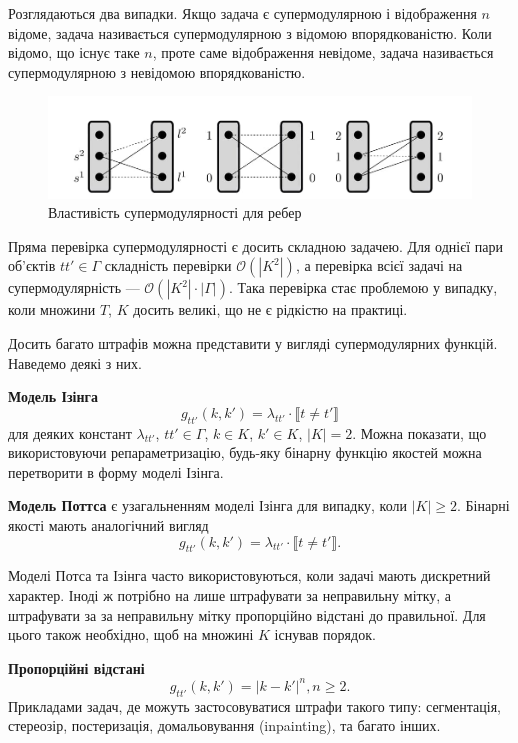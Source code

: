 Розглядаються два випадки. Якщо задача є супермодулярною і відображення $n$ відоме,
задача називається супермодулярною з відомою впорядкованістю. Коли відомо, що існує таке
$n$, проте саме відображення невідоме, задача називається супермодулярною з
невідомою впорядкованістю.
\begin{figure}[h]
  \centering
  \includegraphics[width=1\textwidth]{images/submodularity_ilustr.jpg}
  \caption{Властивість супермодулярності для ребер}
  \label{fig:submodularity_example}
\end{figure}
Пряма перевірка супермодулярності є досить складною задачею. Для
однієї пари об'єктів $tt'\in \Gamma$ складність перевірки
$\mathcal{O}(|K^2|)$, а перевірка всієї задачі на супермодулярність ---
$\mathcal{O}(|K^2|\cdot |\Gamma|)$. Така перевірка стає проблемою у випадку,
коли множини $T$, $K$ досить великі, що не є рідкістю на практиці.

Досить багато штрафів можна представити у вигляді супермодулярних
функцій. Наведемо деякі з них.

\textbf{Модель Ізінга}
\begin{equation*}
  g_{tt'}(k,k') = \lambda_{tt'}\cdot \llbracket t \neq t' \rrbracket
 \end{equation*}
для деяких констант $\lambda_{tt'}$, $tt'\in\Gamma$, $k\in K$, $k'\in K$, $\left\lvert K\right\rvert = 2$.
Можна показати, що використовуючи репараметризацію,
будь-яку бінарну функцію якостей можна перетворити в форму моделі Ізінга.

\textbf{Модель Поттса} є узагальненням моделі Ізінга для випадку, коли $|K|\geq 2$.
Бінарні якості мають аналогічний вигляд
\begin{equation*}
  g_{tt'}(k,k') = \lambda_{tt'}\cdot \llbracket t \neq t' \rrbracket.
\end{equation*}

Моделі Потса та Ізінга часто використовуються, коли задачі мають дискретний
характер. Іноді ж потрібно на лише штрафувати за неправильну мітку, а штрафувати
за за неправильну мітку пропорційно відстані до правильної. Для цього також
необхідно, щоб на множині $K$ існував порядок.

\textbf{Пропорційні відстані}
\begin{equation*}
  g_{tt'}(k,k') = |k - k'|^n, n\geq 2.
\end{equation*}
Прикладами задач, де можуть застосовуватися штрафи такого типу: сегментація,
стереозір, постеризація, домальовування (inpainting), та багато інших.

